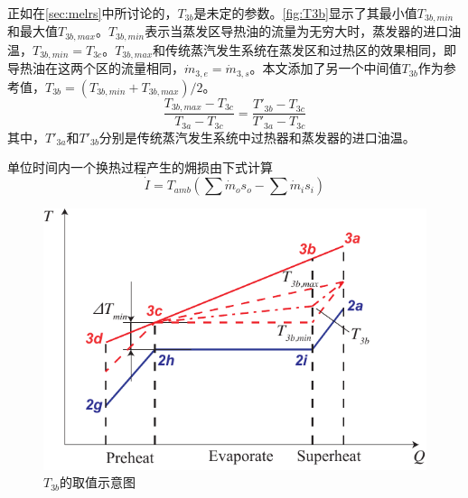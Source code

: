 正如在\autoref{sec:melrs}中所讨论的，$T_{3b}$是未定的参数。\autoref{fig:T3b}显示了其最小值$T_{3b,min}$和最大值$T_{3b,max}$。$T_{3b,min}$表示当蒸发区导热油的流量为无穷大时，蒸发器的进口油温，$T_{3b,min} = T_{3c}$。$T_{3b,max}$和传统蒸汽发生系统在蒸发区和过热区的效果相同，即导热油在这两个区的流量相同，$\dot{m}_{3,e} = \dot{m}_{3,s}$。本文添加了另一个中间值$T_{3b}$作为参考值，$T_{3b} = (T_{3b,min} + T_{3b,max}) / 2$。
\begin{equation}
  \dfrac{T_{3b,max}-T_{3c}}{T_{3a} - T_{3c}} = \dfrac{T'_{3b} - T_{3c}}{T'_{3a} - T_{3c}}
\end{equation}
其中，$T'_{3a}$和$T'_{3b}$分别是传统蒸汽发生系统中过热器和蒸发器的进口油温。

单位时间内一个换热过程产生的㶲损由下式计算
\begin{equation}
  \dot{I} = T_{amb} (\sum \dot{m}_os_o - \sum \dot{m}_is_i)
  \label{eq:dot_I}
\end{equation}

\begin{figure}[htbp]
\centering
	\includegraphics[width = 0.7\columnwidth]{fig/T3b}
	\caption{$T_{3b}$的取值示意图}
	\label{fig:T3b}
\end{figure}

